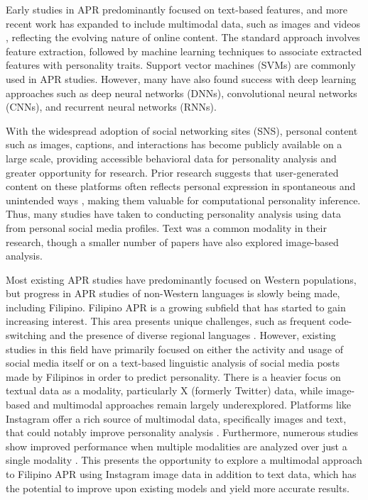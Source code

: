 Early studies in APR predominantly focused on text-based features, and more recent work has expanded to include multimodal data, such as images and videos \citep{Mehta2020}, reflecting the evolving nature of online content. The standard approach involves feature extraction, followed by machine learning techniques to associate extracted features with personality traits. Support vector machines (SVMs) are commonly used in APR studies. However, many have also found success with deep learning approaches \citep{Zhao2022} such as deep neural networks (DNNs), convolutional neural networks (CNNs), and recurrent neural networks (RNNs).

With the widespread adoption of social networking sites (SNS), personal content such as images, captions, and interactions has become publicly available on a large scale, providing accessible behavioral data for personality analysis and greater opportunity for research. Prior research suggests that user-generated content on these platforms often reflects personal expression in spontaneous and unintended ways \citep{Vinciarelli2014}, making them valuable for computational personality inference. Thus, many studies have taken to conducting personality analysis using data from personal social media profiles. Text was a common modality in their research, though a smaller number of papers have also explored image-based analysis. 

Most existing APR studies have predominantly focused on Western populations, but progress in APR studies of non-Western languages is slowly being made, including Filipino. Filipino APR is a growing subfield that has started to gain increasing interest. This area presents unique challenges, such as frequent code-switching and the presence of diverse regional languages \citep{tighe_acorda_2022}. However, existing studies in this field have primarily focused on either the activity and usage of social media itself or on a text-based linguistic analysis of social media posts made by Filipinos in order to predict personality. There is a heavier focus on textual data as a modality, particularly X (formerly Twitter) data, while image-based and multimodal approaches remain largely underexplored. Platforms like Instagram offer a rich source of multimodal data, specifically images and text, that could notably improve personality analysis \citep{Skowron2016}. Furthermore, numerous studies show improved performance when multiple modalities are analyzed over just a single modality \citep{batrinca_multimodal_2016, lima_sequential_2022, batrinca_multimodal_2016, lima_sequential_2022, Skowron2016}. This presents the opportunity to explore a multimodal approach to Filipino APR using Instagram image data in addition to text data, which has the potential to improve upon existing models and yield more accurate results.

